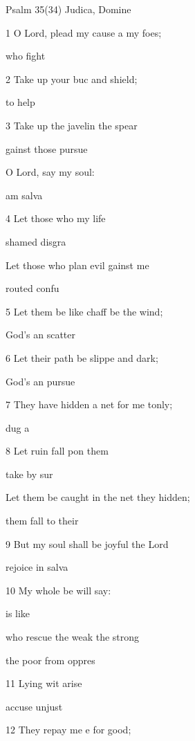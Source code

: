 Psalm 35(34) Judica, Domine 


1 O Lord, plead my cause a my foes; 

  who fight  

2 Take up your buc and shield; 

 to help  

3 Take up the javelin  the spear 

gainst those  pursue  

O Lord, say  my soul: 

 am  salva 

4 Let those who  my life 

 shamed  disgra 

Let those who plan evil gainst me 

 routed  confu 

5 Let them be like chaff be the wind; 

 God's an scatter  

6 Let their path be slippe and dark; 

 God's an pursue  

7 They have hidden a net for me tonly; 

  dug a  

8 Let ruin fall pon them 

 take  by sur 

Let them be caught in the net they  hidden; 

 them fall to their  

9 But my soul shall be joyful  the Lord 

 rejoice in  salva 

10 My whole be will say: 

  is like  

who rescue the weak  the strong 

 the poor from  oppres 

11 Lying wit arise 

 accuse  unjust 

12 They repay me e for good; 

